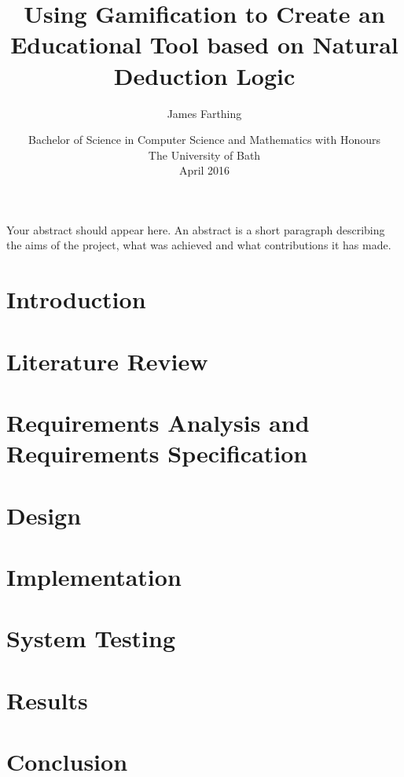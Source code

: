 \documentclass[11pt,openright,a4paper]{report}
\title{Using Gamification to Create an Educational Tool based on Natural Deduction Logic}
\author{James Farthing}
\date{Bachelor of Science in Computer Science and Mathematics with Honours\\The University of Bath\\April 2016}
\begin{document}
 
\newpage

\abstract
Your abstract should appear here.  An abstract is a short
paragraph describing the aims of the project, what was
achieved and what contributions it has made.
\newpage

\maketitle
\newpage
\tableofcontents
\newpage
 
\chapter{Introduction}
	
\chapter{Literature Review}
	
\chapter{Requirements Analysis and Requirements Specification}
	
\chapter{Design}
	
\chapter{Implementation}
	
\chapter{System Testing}
\chapter{Results}
\chapter{Conclusion}
 
\newpage

\end{document}
